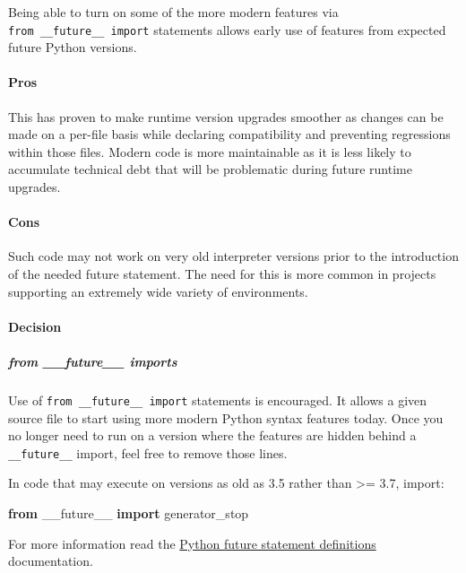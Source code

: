 \documentclass[
]{article}
\newenvironment{Shaded}{}{}
\newcommand{\ImportTok}[1]{\textcolor[rgb]{0.00,0.50,0.00}{\textbf{#1}}}
\newcommand{\NormalTok}[1]{#1}
\begin{document}
Being able to turn on some of the more modern features via
\texttt{from\ \_\_future\_\_\ import} statements allows early use of
features from expected future Python versions.

\paragraph{Pros}

This has proven to make runtime version upgrades smoother as changes can
be made on a per-file basis while declaring compatibility and preventing
regressions within those files. Modern code is more maintainable as it
is less likely to accumulate technical debt that will be problematic
during future runtime upgrades.

\paragraph{Cons}

Such code may not work on very old interpreter versions prior to the
introduction of the needed future statement. The need for this is more
common in projects supporting an extremely wide variety of environments.

\paragraph{Decision}

\subparagraph{from \_\_future\_\_
imports}\label{from-__future__-imports}

Use of \texttt{from\ \_\_future\_\_\ import} statements is encouraged.
It allows a given source file to start using more modern Python syntax
features today. Once you no longer need to run on a version where the
features are hidden behind a \texttt{\_\_future\_\_} import, feel free
to remove those lines.

In code that may execute on versions as old as 3.5 rather than
\textgreater= 3.7, import:

\begin{samepage}
\begin{Shaded}
\begin{Highlighting}[]
\ImportTok{from}\NormalTok{ \_\_future\_\_ }\ImportTok{import}\NormalTok{ generator\_stop}
\end{Highlighting}
\end{Shaded}
\end{samepage}

For more information read the
\href{https://docs.python.org/3/library/__future__.html}{Python future
statement definitions} documentation.
\end{document}
